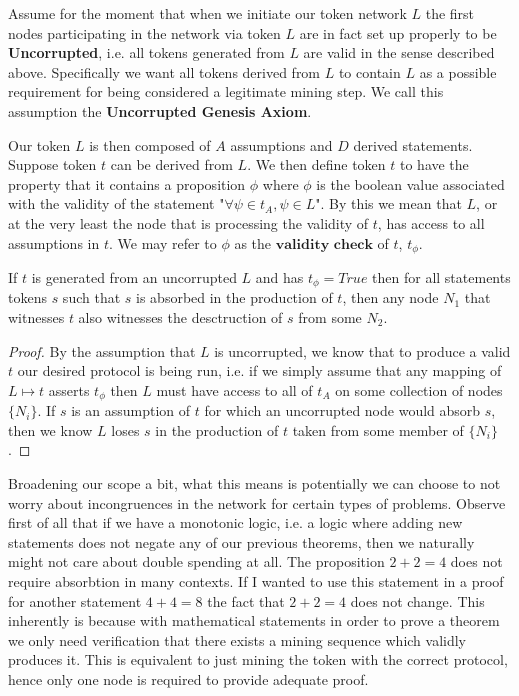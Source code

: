 \documentclass[12pt]{amsart}
\begin{document}
Assume for the moment that when we initiate our token network $L$ the first nodes participating in the network via token $L$ are in fact set up properly to be \textbf{Uncorrupted}, i.e. all tokens generated from $L$ are valid in the sense described above. Specifically we want all tokens derived from $L$ to contain $L$ as a possible requirement for being considered a legitimate mining step. We call this assumption the \textbf{Uncorrupted Genesis Axiom}. \newline


Our token $L$ is then composed of $A$ assumptions and $D$ derived statements. Suppose token $t$ can be derived from $L$. We then define token $t$ to have the property that it contains a proposition $\phi$ where $\phi$ is the boolean value associated with the validity of the statement "$\forall \psi\in t_A , \psi\in L$". By this we mean that $L$, or at the very least the node that is processing the validity of $t$, has access to all assumptions in $t$. We may refer to $\phi$ as the $\textbf{validity check}$ of $t$, $t_\phi$.

\begin{thm}
 If $t$ is generated from an uncorrupted $L$ and has $t_\phi = True$ then for all statements tokens $s$ such that $s$ is absorbed in the production of $t$, then any node $N_1$ that witnesses $t$ also witnesses the desctruction of $s$ from some $N_2$.
\end{thm}
\begin{proof}
By the assumption that $L$ is uncorrupted, we know that to produce a valid $t$ our desired protocol is being run, i.e. if we simply assume that any mapping of $L\mapsto t$ asserts $t_\phi$ then $L$ must have access to all of $t_A$ on some collection of nodes $\{N_i\}$. If $s$ is an assumption of $t$ for which an uncorrupted node would absorb $s$, then we know $L$ loses $s$ in the production of $t$ taken from some member of $\{N_i\}$.
\end{proof}

Broadening our scope a bit, what this means is potentially we can choose to not worry about incongruences in the network for certain types of problems. Observe first of all that if we have a monotonic logic, i.e. a logic where adding new statements does not negate any of our previous theorems, then we naturally might not care about double spending at all. The proposition $2+2 = 4$ does not require absorbtion in many contexts. If I wanted to use this statement in a proof for another statement $4 + 4 = 8$ the fact that $2 +2 = 4$ does not change. This inherently is because with mathematical statements in order to prove a theorem we only need verification that there exists a mining sequence which validly produces it. This is equivalent to just mining the token with the correct protocol, hence only one node is required to provide adequate proof. \newline
\end{document}
